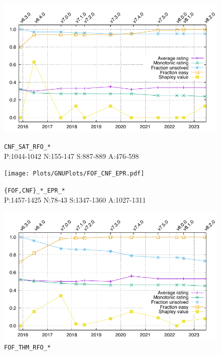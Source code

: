 \documentclass[runningheads]{llncs}
\begin{document}
\begin{figure}[b!]
\begin{minipage}[t]{.49\textwidth}
  \centering
  \includegraphics[width=\textwidth]{Plots/GNUPlots/CNF_SAT_RFO.pdf}
  \vspace*{-2em}
  \caption{{\tt CNF\_SAT\_RFO\_*} \\
           {\scriptsize P:1044-1042 N:155-147 S:887-889 A:476-598}}
  \label{Plot_CNF_SAT}
\end{minipage}
\begin{minipage}[t]{.49\textwidth}
  \centering
  \texttt{[image: Plots/GNUPlots/FOF\_CNF\_EPR.pdf]}
  \vspace*{-2em}
  \caption{{\tt \{FOF,CNF\}\_*\_EPR\_*} \\
           {\scriptsize P:1457-1425 N:78-43 S:1347-1360 A:1027-1311}}
  \label{Plot_FOF_CNF_EPR}
\end{minipage}
\begin{minipage}[t]{.49\textwidth}
  \centering
  \includegraphics[width=\textwidth]{Plots/GNUPlots/FOF_THM_RFO.pdf}
  \vspace*{-2em}
  \caption{{\tt FOF\_THM\_RFO\_*} \\
}
\end{minipage}
\end{figure}
\end{document}
